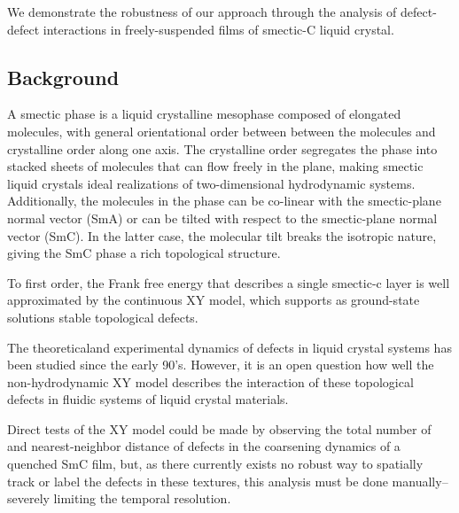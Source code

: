 \documentclass[prl,reprint,showpacs,floatfix,nofootinbib]{revtex4-1}
\begin{document}
We demonstrate the robustness of our approach through the analysis of defect-defect interactions in freely-suspended films of smectic-C liquid crystal.

\subsection{Background}
A smectic phase is a liquid crystalline mesophase composed of elongated molecules, with general orientational order between between the molecules and crystalline order along one axis.
The crystalline order segregates the phase into stacked sheets of molecules that can flow freely in the plane, making smectic liquid crystals ideal realizations of two-dimensional hydrodynamic systems. Additionally, the molecules in the phase can be co-linear with the smectic-plane normal vector (SmA) or can be tilted with respect to the smectic-plane normal vector (SmC). In the latter case, the molecular tilt breaks the isotropic nature, giving the SmC phase a rich topological structure. 

To first order, the Frank free energy that describes a single smectic-c layer is well approximated by the continuous XY model, which supports as ground-state solutions stable topological defects.


The theoretical\cite{yurke_coarsening_1993, svensek_hydrodynamics_2002, svensek_hydrodynamics_2003,radzihovsky_anomalous_2015, pleiner_dynamics_1988}and experimental\cite{pargellis_defect_1992,pargellis_planar_1994, oswald_nematic_2005,stannarius_defect_2016} dynamics of defects in liquid crystal systems has been studied since the early 90's. However, it is an open question how well the non-hydrodynamic XY model describes the interaction of these topological defects in fluidic systems of liquid crystal materials.

Direct tests of the XY model could be made by observing the total number of and nearest-neighbor distance of defects in the coarsening dynamics of a quenched SmC film, but, as there currently exists no robust way to spatially track or label the defects in these textures, this analysis must be done manually-- severely limiting the temporal resolution.
\end{document}
